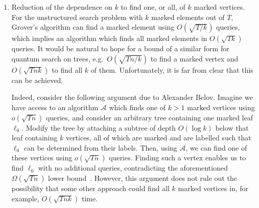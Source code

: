 \documentclass[11pt]{article}
\newcommand{\ket}[1]{| #1 \rangle}
\begin{document}
\begin{enumerate}
\item Reduction of the dependence on $k$ to find one, or all, of $k$ marked vertices. For the unstructured search problem with $k$ marked elements out of $T$, Grover's algorithm can find a marked element using $O(\sqrt{T / k})$ queries, which implies an algorithm which finds all marked elements in $O(\sqrt{Tk})$ queries. It would be natural to hope for a bound of a similar form for quantum search on trees, e.g.~$O(\sqrt{Tn/k})$ to find a marked vertex and $O(\sqrt{Tnk})$ to find all $k$ of them. Unfortunately, it is far from clear that this can be achieved.

Indeed, consider the following argument due to Alexander Belov. Imagine we have access to an algorithm $\mathcal{A}$ which finds one of $k > 1$ marked vertices using $o(\sqrt{Tn})$ queries, and consider an arbitrary tree containing one marked leaf $\ell_0$. Modify the tree by attaching a subtree of depth $O(\log k)$ below that leaf containing $k$ vertices, all of which are marked and are labelled such that $\ell_0$ can be determined from their labels. Then, using $\mathcal{A}$, we can find one of these vertices using $o(\sqrt{Tn})$ queries. Finding such a vertex enables us to find $\ell_0$ with no additional queries, contradicting the aforementioned $\Omega(\sqrt{Tn})$ lower bound~\cite{aaronson05}. However, this argument does not rule out the possibility that some other approach could find all $k$ marked vertices in, for example, $O(\sqrt{Tnk})$ time.


\end{enumerate}
\end{document}
